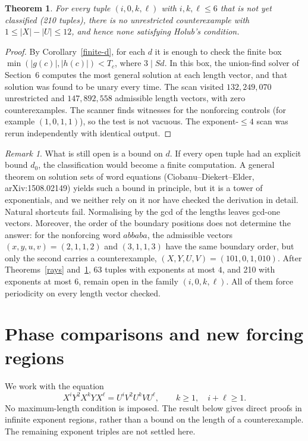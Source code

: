 \documentclass[11pt]{article}
\newtheorem{theorem}{Theorem}
\theoremstyle{remark}\newtheorem*{remark}{Remark}
\begin{document}
\begin{theorem}\label{d12}
For every tuple \((i,0,k,\ell)\) with \(i,k,\ell\le6\) that is not yet classified (210 tuples), there is no unrestricted counterexample with \(1\le|X|-|U|\le12\), and hence none satisfying Holub's condition.
\end{theorem}
\begin{proof}
By Corollary~\ref{finite-d}, for each \(d\) it is enough to check the finite box \(\min(|g(c)|,|h(c)|)<T_c\), where \(3\mid Sd\). In this box, the union-find solver of Section~6 computes the most general solution at each length vector, and that solution was found to be unary every time. The scan visited \(132{,}249{,}070\) unrestricted and \(147{,}892{,}558\) admissible length vectors, with zero counterexamples. The scanner finds witnesses for the nonforcing controls (for example \((1,0,1,1)\)), so the test is not vacuous. The exponent-\(\le4\) scan was rerun independently with identical output.
\end{proof}

\begin{remark}
What is still open is a bound on \(d\). If every open tuple had an explicit bound \(d_0\), the classification would become a finite computation. A general theorem on solution sets of word equations (Ciobanu--Diekert--Elder, arXiv:1508.02149) yields such a bound in principle, but it is a tower of exponentials, and we neither rely on it nor have checked the derivation in detail. Natural shortcuts fail. Normalising by the gcd of the lengths leaves gcd-one vectors. Moreover, the order of the boundary positions does not determine the answer: for the nonforcing word \(abbaba\), the admissible vectors \((x,y,u,v)=(2,1,1,2)\) and \((3,1,1,3)\) have the same boundary order, but only the second carries a counterexample, \((X,Y,U,V)=(101,0,1,010)\).
After Theorems~\ref{rays} and~\ref{d12}, 63 tuples with exponents at most \(4\), and 210 with exponents at most \(6\), remain open in the family \((i,0,k,\ell)\). All of them force periodicity on every length vector checked.
\end{remark}

\section{Phase comparisons and new forcing regions}
\label{sec:phase-comparisons}
We work with the equation
\begin{equation}\label{ph:eq}
 X^iY^2X^kYX^\ell=U^iV^2U^kVU^\ell,
 \qquad k\ge1,\quad i+\ell\ge1.
\end{equation}
No maximum-length condition is imposed. The result below gives direct
proofs in infinite exponent regions, rather than a bound on the length
of a counterexample. The remaining exponent triples are not settled here.
\end{document}

